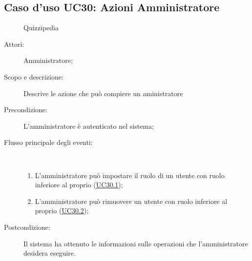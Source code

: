 \subsection{Caso d'uso UC30: Azioni Amministratore}
	\begin{figure}[H]
		\centering
		\begin{resizedtikzpicture}{\textwidth}
		\begin{umlsystem}[x=0, fill=lightgray!20]{Quizzipedia}
		\end{umlsystem}
		\end{resizedtikzpicture}
		\caption{}
	\end{figure}
\begin{description}
\item[Attori:] Amministratore;
\item[Scopo e descrizione:] Descrive le azione che può compiere un aministratore
      \item[Precondizione:] L'amministratore è autenticato nel sistema;

        \item[Flusso principale degli eventi:] \ 
 \begin{enumerate}
          \item L'amministratore può impostare il ruolo di un utente con ruolo inferiore al proprio (\hyperlink{UC30.1}{UC30.1});
          \item L'amministratore può rimuovere un utente con ruolo inferiore al proprio (\hyperlink{UC30.2}{UC30.2});

      \end{enumerate}
    \item[Postcondizione:] Il sistema ha ottenuto le informazioni sulle operazioni che l’amministratore desidera eseguire.
  \end{description}
\hypertarget{UC30.1}{}
